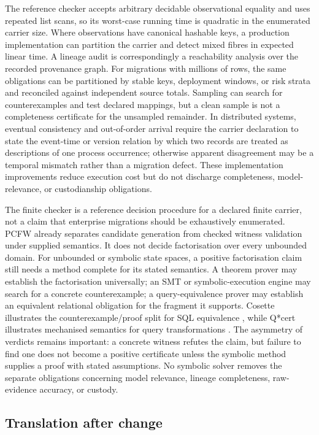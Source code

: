 \documentclass[11pt]{article}
\theoremstyle{definition}
\begin{document}
The reference checker accepts arbitrary decidable observational equality and uses repeated list scans, so its worst-case running time is quadratic in the enumerated carrier size. Where observations have canonical hashable keys, a production implementation can partition the carrier and detect mixed fibres in expected linear time. A lineage audit is correspondingly a reachability analysis over the recorded provenance graph. For migrations with millions of rows, the same obligations can be partitioned by stable keys, deployment windows, or risk strata and reconciled against independent source totals. Sampling can search for counterexamples and test declared mappings, but a clean sample is not a completeness certificate for the unsampled remainder. In distributed systems, eventual consistency and out-of-order arrival require the carrier declaration to state the event-time or version relation by which two records are treated as descriptions of one process occurrence; otherwise apparent disagreement may be a temporal mismatch rather than a migration defect. These implementation improvements reduce execution cost but do not discharge completeness, model-relevance, or custodianship obligations.

The finite checker is a reference decision procedure for a declared finite carrier, not a claim that enterprise migrations should be exhaustively enumerated. PCFW already separates candidate generation from checked witness validation under supplied semantics. It does not decide factorisation over every unbounded domain. For unbounded or symbolic state spaces, a positive factorisation claim still needs a method complete for its stated semantics. A theorem prover may establish the factorisation universally; an SMT or symbolic-execution engine may search for a concrete counterexample; a query-equivalence prover may establish an equivalent relational obligation for the fragment it supports. Cosette illustrates the counterexample/proof split for SQL equivalence \citep{chucosette2017}, while Q*cert illustrates mechanised semantics for query transformations \citep{auerbach2017}. The asymmetry of verdicts remains important: a concrete witness refutes the claim, but failure to find one does not become a positive certificate unless the symbolic method supplies a proof with stated assumptions. No symbolic solver removes the separate obligations concerning model relevance, lineage completeness, raw-evidence accuracy, or custody.



\subsection{Translation after change}\label{ex:sec:debt-extensions}
\end{document}
